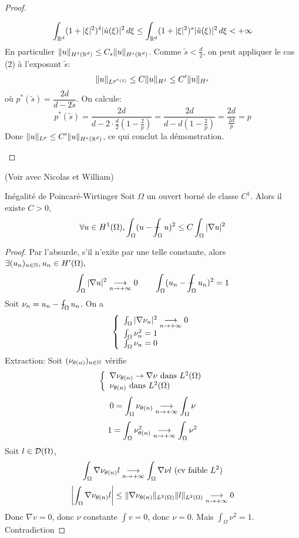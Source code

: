 \documentclass[]{report}
\begin{document}
\begin{proof}
\begin{enumerate}
            \[\int_{\mathbb{R}^d}(1+|\xi|^2)^{\tilde{s}}|\hat{u}(\xi)|^2\, d\xi\le\int_{\mathbb{R}^d}(1+|\xi|^2)^s|\hat{u}(\xi)|^2\, d\xi<+\infty\]
            En particulier $\lVert u \rVert_{H^{\tilde{s}}(\mathbb{R}^d)}\le C_s\lVert u \rVert_{H^s(\mathbb{R}^d)}$. Comme $\tilde{s}<\frac{d}{2}$, on peut appliquer le cas (2) à l'exposant $\tilde{s}$:
            \[\lVert u \rVert_{L^{p^*(\tilde{s})}}\le C\lVert u \rVert_{H^{\tilde{s}}}\le C'\lVert u \rVert_{H^s}\]
            où $p^*(\tilde{s})=\dfrac{2d}{d-2\tilde{s}}$. On calcule:
            \[p^*(\tilde{s})=\frac{2d}{d-2\cdot\frac{d}{2}\!\left(1-\frac{2}{p}\right)}=\frac{2d}{d-d\!\left(1-\frac{2}{p}\right)}=\frac{2d}{\frac{2d}{p}}=p\]
            Donc $\lVert u \rVert_{L^p}\le C'\lVert u \rVert_{H^s(\mathbb{R}^d)}$, ce qui conclut la démonstration.
        \end{enumerate}
    \end{proof}

    (Voir avec Nicolas et William)

    \begin{tm}{Inégalité de Poincaré-Wirtinger}{}
        Soit $\Omega$ un ouvert borné de classe $C^1$. Alors il existe $C>0,$
        \[\forall u\in H^1(\Omega),\int_{\Omega}(u-\dashint_{\Omega} u)^2\le C\int_{\Omega}|\nabla u|^2\]
    \end{tm}

    \begin{proof}
        Par l'absurde, s'il n'exite par une telle constante, alors $\exists (u_n)_{n\in\mathbb{N}},u_n\in H'(\Omega),$
        \[\int_{\Omega} |\nabla u|^2 \toninfty 0\qquad \int_{\Omega}(u_n-\dashint_{\Omega} u_n)^2=1\]
        Soit $\nu_n= u_n-\dashint_\Omega u_n$. On a 
        \[\left\{\begin{array}{ll} \int_\Omega |\nabla \nu_n|^2\underset{n\to +\infty}{\longrightarrow} 0\\ \int_\Omega \nu_n^2=1 \\\int_\Omega \nu_n =0 \end{array} \right.\]
        Extraction: Soit $(\nu_{\theta(n)})_{n\in\mathbb{N}}$ vérifie
        \[\left\{\begin{array}{ll} \nabla \nu_{\theta(n)}\to \nabla \nu\text{ dans $L^2(\Omega)$}\\ \nu_{\theta(n)}\text{ dans $L^2(\Omega)$} \end{array} \right.\]
        \[0=\int_\Omega \nu_{\theta(n)}\underset{n\to +\infty}{\longrightarrow} \int_{\Omega}\nu\]
        \[1=\int_\Omega \nu_{\theta(n)}^2\underset{n\to +\infty}{\longrightarrow} \int_\Omega \nu^2\]
        Soit $l\in \mathcal{D}(\Omega)$,
        \[\int_\Omega \nabla \nu_{\theta(n)}l\underset{n\to +\infty}{\longrightarrow}\int_\Omega\nabla \nu l\text{ (cv faible $L^2$)}\]
        \[\left|\int_\Omega \nabla \nu_{\theta(n)}l\right|\le \lVert \nabla \nu_{\theta(n)} \rVert_{L^2(\Omega)}\lVert l \rVert_{L^2(\Omega)}\underset{n\to +\infty}{\longrightarrow} 0\]
        Donc $\nabla v=0$, donc $\nu$ constante $\int v=0$, donc $\nu=0$. Mais $\int_{\Omega}\nu^2=1$. Contradiction
    \end{proof}
\end{document}
